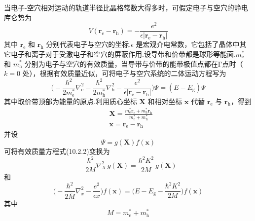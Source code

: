 当电子-空穴相对运动的轨道半径比晶格常数大得多时，可假定电子与空穴的静电库仑势为
\begin{equation}
  V(\boldsymbol{r}_{\mathrm{e}}-\boldsymbol{r}_{\mathrm{h}})
  =-\frac{e^{2}}{\epsilon|\boldsymbol{r}_{\mathrm{e}}-\boldsymbol{r}_{\mathrm{h}}|}
\end{equation}
其中 $\boldsymbol{r}_{\mathrm{e}}$ 和 $\boldsymbol{r}_{\mathrm{h}}$ 分别代表电子与空穴的坐标.$\epsilon$ 是宏观介电常数，它包括了晶体中其它电子和离子对于受激电子和空穴的屏蔽作用.设导带和价带都是球形等能面.$m_{\mathrm{e}}^{*}$ 和 $m_{\mathrm{h}}^{*}$ 分别为电子与空穴的有效质量，当导带与价带的能带极值点都在Γ点时（$k=0$ 处），根据有效质量近似，可将电子与空穴系统的二体运动方程写为
\begin{equation}
  \Biggl(-\frac{\hbar^{2}}{2m_{\mathrm{e}}^{*}}\nabla_{\mathrm{e}}^{2}
  -\frac{\hbar^{2}}{2m_{\mathrm{h}}^{*}}\nabla_{\mathrm{h}}^{2}
  -\frac{e^{2}}{\epsilon|\boldsymbol{r}_{\mathrm{e}}-\boldsymbol{r}_{\mathrm{h}}|}\Biggr)\varPsi
  =\left(E-E_{\mathrm{g}}\right)\varPsi
\end{equation}
其中取价带顶部为能量的原点.利用质心坐标 $\boldsymbol{X}$ 和相对坐标 $\boldsymbol{x}$ 代替 $\boldsymbol{r}_{\mathrm{e}}$ 与 $\boldsymbol{r}_{\mathrm{h}}$，得到
\begin{equation}
\begin{aligned}
  &\boldsymbol{X}=\frac{m_{\mathrm{e}}^{*}\boldsymbol{r}_{\mathrm{e}}
  +m_{\mathrm{h}}^{*}\boldsymbol{r}_{\mathrm{h}}}{m_{\mathrm{e}}^{*}+m_{\mathrm{h}}^{*}}\\
  &\boldsymbol{x}=\boldsymbol{r}_{\mathrm{e}}-\boldsymbol{r}_{\mathrm{h}}
\end{aligned}
\end{equation}
并设
\begin{equation*}
  \varPsi=g(\boldsymbol{X})f(\boldsymbol{x})
\end{equation*}
可将有效质量方程式(10.2.2)变换为
\begin{equation}
  -\frac{\hbar^{2}}{2M}\nabla_{X}^{2}\,g(\boldsymbol{X})
  =\frac{\hbar^{2}K^{2}}{2M}\,g(\boldsymbol{X})
\end{equation}
和
\begin{equation}
  \Biggl(-\frac{\hbar^{2}}{2\overline{M}}\nabla_{x}^{2}
  -\frac{e^{2}}{\epsilon x}\Biggr)f(\boldsymbol{x})
  =\Biggl(E-E_{\mathrm{g}}-\frac{\hbar^{2}K^{2}}{2M}\Biggr)f(\boldsymbol{x})
\end{equation}
其中
\begin{equation}
  M=m_{\mathrm{e}}^{*}+m_{\mathrm{h}}^{*}
\end{equation}
